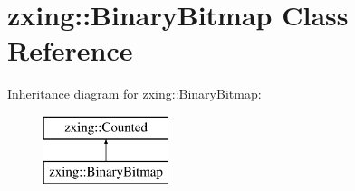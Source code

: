 \hypertarget{classzxing_1_1_binary_bitmap}{}\section{zxing\+:\+:Binary\+Bitmap Class Reference}
\label{classzxing_1_1_binary_bitmap}
Inheritance diagram for zxing\+:\+:Binary\+Bitmap\+:\begin{figure}[H]
\begin{center}
\leavevmode
\includegraphics[height=2.000000cm]{classzxing_1_1_binary_bitmap}
\end{center}
\end{figure}
